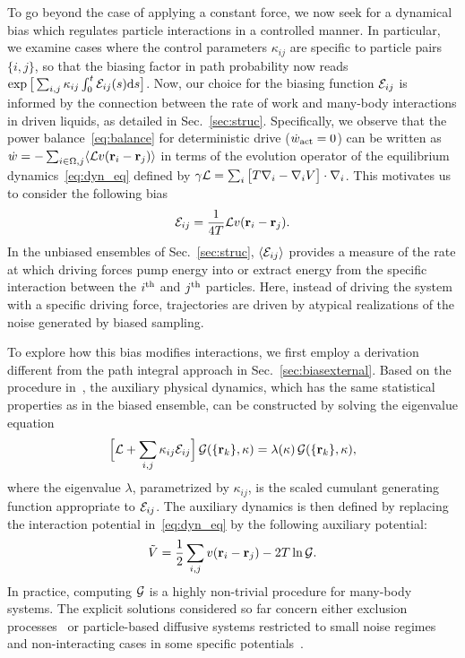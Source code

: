 \documentclass[superscriptaddress, twocolumn, prx, longbibliography, nofootinbib]{revtex4-1}
\begin{document}
To go beyond the case of applying a constant force, we now seek for a dynamical bias which regulates particle interactions in a controlled manner. In particular, we examine cases where the control parameters $\kappa_{ij}$ are specific to particle pairs $\{i,j\}$, so that the biasing factor in path probability now reads $\exp\big[\sum_{i,j}\kappa_{ij}\int_0^t{\cal E}_{ij}(s){\rm d}s\big]$. {Now}, our choice for the biasing function ${\cal E}_{ij}$ is informed by the connection between the rate of work and many-body interactions in driven liquids, as detailed in Sec.~\ref{sec:struc}. Specifically, we observe that the power balance~\eqref{eq:balance} for deterministic drive ($\dot w_{\rm act}=0$) can be written as $\dot w = - \sum_{i\in\Omega,j} \langle{\cal L} v({\bf r}_i-{\bf r}_j)\rangle$ in terms of the evolution operator of the equilibrium dynamics~\eqref{eq:dyn_eq} defined by $\gamma{\cal L} = \sum_i\big[ T \nabla_i - \nabla_i V\big] \cdot\nabla_i $. This motivates us to consider the following bias
\begin{equation}\label{eq:eps_bis}
	{\cal E}_{ij} = \frac{1}{4T} {\cal L} v({\bf r}_i-{\bf r}_j) .
\end{equation}
In the unbiased ensembles of Sec.~\ref{sec:struc}, $\langle {\cal E}_{ij} \rangle$ provides a measure of the rate at which driving forces pump energy into or extract energy from the specific interaction between the $i^{\rm th}$ and $j^{\rm th}$ particles. Here, instead of driving the system with a specific driving force, trajectories are driven by atypical realizations of the noise generated by biased sampling.


To explore how this bias modifies interactions, we first employ a derivation different from the path integral approach in Sec.~\ref{sec:biasexternal}. Based on the procedure in~\cite{Jack2010, Chetrite2013}, the auxiliary physical dynamics, which has the same statistical properties as in the biased ensemble, can be constructed by solving the eigenvalue equation 
\begin{equation}\label{eq:adjointbiased}
	\Big[ {\cal L} + \sum_{i,j}\kappa_{ij}{\cal E}_{ij} \Big]\,{\cal G}(\{{\bf r}_k\},\kappa) = \lambda(\kappa)\,{\cal G}(\{{\bf r}_k\},\kappa) ,
\end{equation}
where the eigenvalue $\lambda$, parametrized by $\kappa_{ij}$, is the scaled cumulant generating function appropriate to ${\cal E}_{ij}$. The auxiliary dynamics is then defined by replacing the interaction potential in~\eqref{eq:dyn_eq} by the following auxiliary potential:
\begin{equation} \label{eq:auxiliary}
	\tilde V = \frac{1}{2}\sum_{i,j} v({\bf r}_i-{\bf r}_j) - 2 T \ln{\cal G} .
\end{equation}
In practice, computing $\cal G$ is a highly non-trivial procedure for many-body systems. The explicit solutions considered so far concern either exclusion processes~\cite{Popkov2010, Popkov2011, Limmer2018a} or particle-based diffusive systems restricted to small noise regimes~\cite{Lecomte2019, Proesmans2019} and non-interacting cases in some specific potentials~\cite{Majumdar2002, Touchette2016, Touchette2018}.
\end{document}
